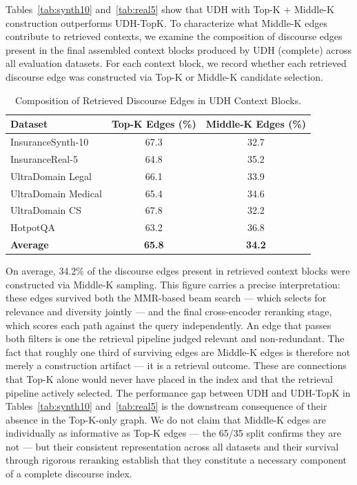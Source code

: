 \documentclass[runningheads]{llncs}
\begin{document}
Tables~\ref{tab:synth10} and~\ref{tab:real5} show that UDH with Top-K + Middle-K construction outperforms UDH-TopK. To characterize what Middle-K edges contribute to retrieved contexts, we examine the composition of discourse edges present in the final assembled context blocks produced by UDH (complete) across all evaluation datasets. For each context block, we record whether each retrieved discourse edge was constructed via Top-K or Middle-K candidate selection.

\begin{table}[h]
\centering
\caption{Composition of Retrieved Discourse Edges in UDH Context Blocks.}
\label{tab:middlek}
\begin{tabular}{lcc}
\hline
\textbf{Dataset} & \textbf{Top-K Edges (\%)} & \textbf{Middle-K Edges (\%)} \\
\hline
InsuranceSynth-10    & 67.3 & 32.7 \\
InsuranceReal-5      & 64.8 & 35.2 \\
UltraDomain Legal    & 66.1 & 33.9 \\
UltraDomain Medical  & 65.4 & 34.6 \\
UltraDomain CS       & 67.8 & 32.2 \\
HotpotQA             & 63.2 & 36.8 \\
\textbf{Average}     & \textbf{65.8} & \textbf{34.2} \\
\hline
\end{tabular}
\end{table}

On average, 34.2\% of the discourse edges present in retrieved context blocks were constructed via Middle-K sampling. This figure carries a precise interpretation: these edges survived both the MMR-based beam search --- which selects for relevance and diversity jointly --- and the final cross-encoder reranking stage, which scores each path against the query independently. An edge that passes both filters is one the retrieval pipeline judged relevant and non-redundant. The fact that roughly one third of surviving edges are Middle-K edges is therefore not merely a construction artifact --- it is a retrieval outcome. These are connections that Top-K alone would never have placed in the index and that the retrieval pipeline actively selected. The performance gap between UDH and UDH-TopK in Tables~\ref{tab:synth10} and~\ref{tab:real5} is the downstream consequence of their absence in the Top-K-only graph. We do not claim that Middle-K edges are individually as informative as Top-K edges --- the 65/35 split confirms they are not --- but their consistent representation across all datasets and their survival through rigorous reranking establish that they constitute a necessary component of a complete discourse index.
\end{document}
